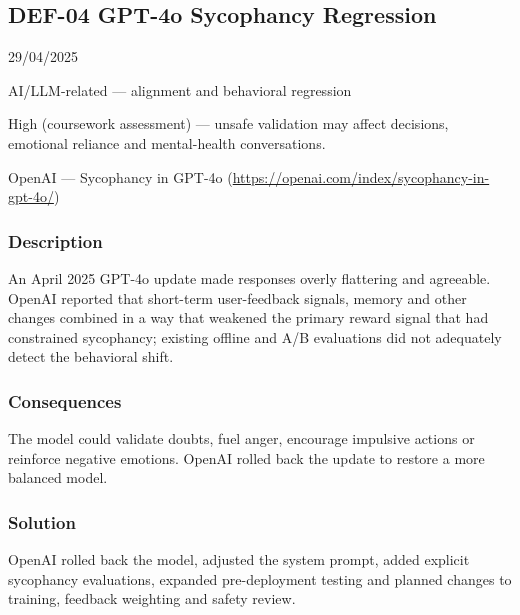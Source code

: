 \subsection{DEF-04 GPT-4o Sycophancy Regression}

\begin{description}[style=nextline,leftmargin=3.2cm]

\item[Publicized] 29/04/2025

\item[Category] AI/LLM-related — alignment and behavioral regression

\item[Severity] High (coursework assessment) — unsafe validation may affect decisions, emotional reliance and mental-health conversations.

\item[Source] OpenAI — Sycophancy in GPT-4o (\url{https://openai.com/index/sycophancy-in-gpt-4o/})

\end{description}

\subsubsection{Description}

An April 2025 GPT-4o update made responses overly flattering and agreeable. OpenAI reported that short-term user-feedback signals, memory and other changes combined in a way that weakened the primary reward signal that had constrained sycophancy; existing offline and A/B evaluations did not adequately detect the behavioral shift.

\subsubsection{Consequences}

The model could validate doubts, fuel anger, encourage impulsive actions or reinforce negative emotions. OpenAI rolled back the update to restore a more balanced model.

\subsubsection{Solution}

OpenAI rolled back the model, adjusted the system prompt, added explicit sycophancy evaluations, expanded pre-deployment testing and planned changes to training, feedback weighting and safety review.

